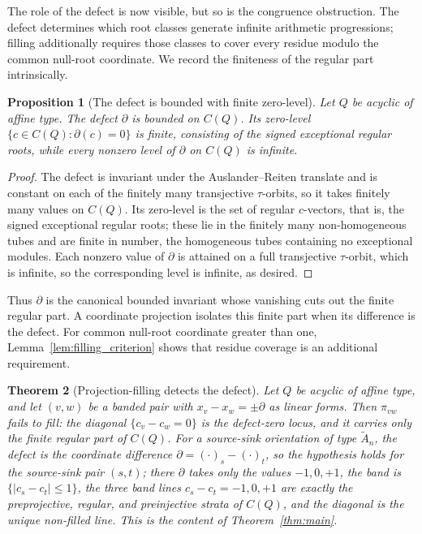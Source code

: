 \documentclass[11pt, a4paper]{amsart}
\newtheorem{theorem}{Theorem}[section]
\newtheorem{proposition}[theorem]{Proposition}
\theoremstyle{definition}
\begin{document}
The role of the defect is now visible, but so is the congruence obstruction.
The defect determines which root classes generate infinite arithmetic
progressions; filling additionally requires those classes to cover every
residue modulo the common null-root coordinate. We record the finiteness of
the regular part intrinsically.

\begin{proposition}[The defect is bounded with finite zero-level]
\label{prop:defect_obstruction}
Let $Q$ be acyclic of affine type. The defect $\partial$ is bounded on
$C(Q)$. Its zero-level $\{c \in C(Q) : \partial(c) = 0\}$ is finite,
consisting of the signed exceptional regular roots, while every nonzero
level of $\partial$ on $C(Q)$ is infinite.
\end{proposition}

\begin{proof}
The defect is invariant under the Auslander--Reiten translate and is
constant on each of the finitely many transjective $\tau$-orbits, so it
takes finitely many values on $C(Q)$. Its zero-level is the set of regular
$c$-vectors, that is, the signed exceptional regular roots; these lie in the
finitely many non-homogeneous tubes and are finite in number, the
homogeneous tubes containing no exceptional modules. Each nonzero value of $\partial$ is
attained on a full transjective $\tau$-orbit, which is infinite, so the
corresponding level is infinite, as desired.
\end{proof}

Thus $\partial$ is the canonical bounded invariant whose vanishing cuts
out the finite regular part. A coordinate projection isolates this finite
part when its difference is the defect. For common null-root coordinate
greater than one, Lemma~\ref{lem:filling_criterion} shows that residue
coverage is an additional requirement.

\begin{theorem}[Projection-filling detects the defect]
\label{thm:defect_detection}
Let $Q$ be acyclic of affine type, and let $(v, w)$ be a banded pair with
$x_v - x_w = \pm\partial$ as linear forms. Then $\pi_{vw}$ fails to fill:
the diagonal $\{c_v - c_w = 0\}$ is the defect-zero locus, and it carries
only the finite regular part of $C(Q)$. For a source-sink orientation of type
$\widetilde{A}_n$, the defect is the coordinate difference
$\partial = (\cdot)_s - (\cdot)_t$, so the hypothesis holds for the
source-sink pair $(s, t)$; there $\partial$ takes only the values $-1, 0, +1$, the band is
$\{|c_s - c_t| \leq 1\}$, the three band lines $c_s - c_t = -1, 0, +1$
are exactly the preprojective, regular, and preinjective strata of
$C(Q)$, and the diagonal is the unique non-filled line. This is the
content of Theorem~\ref{thm:main}.
\end{theorem}
\end{document}
